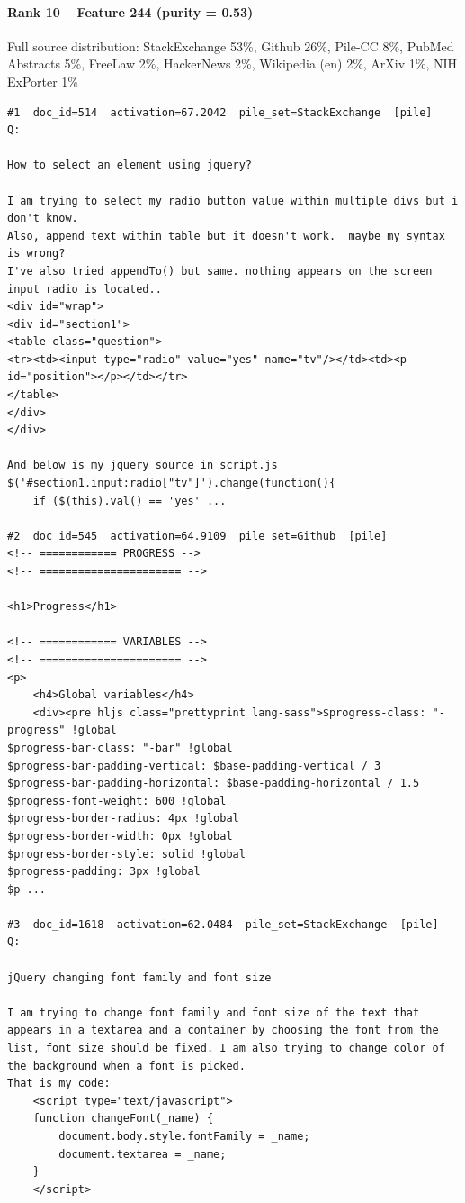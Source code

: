 \paragraph*{Rank 10 -- Feature 244 (purity = 0.53)}

Full source distribution: StackExchange 53\%, Github 26\%, Pile-CC 8\%, PubMed Abstracts 5\%, FreeLaw 2\%, HackerNews 2\%, Wikipedia (en) 2\%, ArXiv 1\%, NIH ExPorter 1\%

\begin{verbatim}
#1  doc_id=514  activation=67.2042  pile_set=StackExchange  [pile]
Q:

How to select an element using jquery?

I am trying to select my radio button value within multiple divs but i don't know.
Also, append text within table but it doesn't work.  maybe my syntax is wrong?
I've also tried appendTo() but same. nothing appears on the screen
input radio is located..
<div id="wrap">
<div id="section1">
<table class="question">
<tr><td><input type="radio" value="yes" name="tv"/></td><td><p id="position"></p></td></tr>
</table>
</div>
</div>

And below is my jquery source in script.js
$('#section1.input:radio["tv"]').change(function(){
    if ($(this).val() == 'yes' ...

#2  doc_id=545  activation=64.9109  pile_set=Github  [pile]
<!-- ============ PROGRESS -->
<!-- ====================== -->

<h1>Progress</h1>

<!-- ============ VARIABLES -->
<!-- ====================== -->
<p>
	<h4>Global variables</h4>
	<div><pre hljs class="prettyprint lang-sass">$progress-class: "-progress" !global
$progress-bar-class: "-bar" !global
$progress-bar-padding-vertical: $base-padding-vertical / 3
$progress-bar-padding-horizontal: $base-padding-horizontal / 1.5
$progress-font-weight: 600 !global
$progress-border-radius: 4px !global
$progress-border-width: 0px !global
$progress-border-style: solid !global
$progress-padding: 3px !global
$p ...

#3  doc_id=1618  activation=62.0484  pile_set=StackExchange  [pile]
Q:

jQuery changing font family and font size

I am trying to change font family and font size of the text that appears in a textarea and a container by choosing the font from the list, font size should be fixed. I am also trying to change color of the background when a font is picked. 
That is my code:
    <script type="text/javascript">     
    function changeFont(_name) {
        document.body.style.fontFamily = _name;
        document.textarea = _name;
    } 
    </script>


\end{verbatim}

